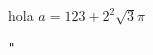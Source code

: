 \documentclass[]{article}
\begin{document}
hola
$a = 123 + 2^2 \sqrt{3}{\pi}$

\verb!"!
\end{document}
